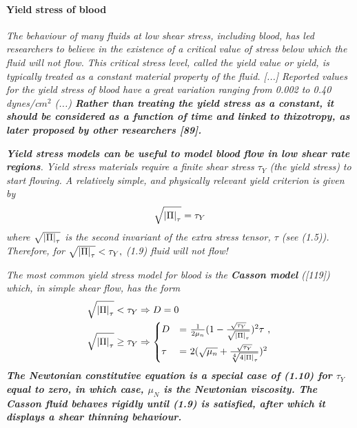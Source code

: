\documentclass[11pt,letterpaper]{article}
\begin{document}
\paragraph{Yield stress of blood} \textit{The behaviour of many fluids at low shear stress, including blood, has led researchers to believe in the existence of a critical value of stress below which the fluid will not flow. This critical stress level, called the yield value or yield, is typically treated as a constant material property of the fluid. [...] Reported values for the yield stress of blood have a great variation ranging from 0.002 to 0.40 dynes/c$m^2$ (...) \textbf{Rather than treating the yield stress as a constant, it should be considered as a function of time and linked to thixotropy, as later proposed by other researchers [89].}}

\textit{{\color{blue}\textbf{Yield stress models can be useful to model blood flow in low shear rate regions}}. Yield stress materials
require a finite shear stress $\tau_Y$ (the yield stress) to start flowing. A relatively simple, and physically relevant yield criterion is given by \begin{equation}
    \sqrt{\abs{\Pi}_{\tau}} = \tau_Y
\end{equation}
where $\sqrt{\abs{\Pi}_{\tau}}$ is the second invariant of the extra stress tensor, $\tau$  (see (1.5)). Therefore, for $ \sqrt{\abs{\Pi}_{\tau}} < \tau_Y,$ (1.9)
fluid will not flow!}


\textit{The most common yield stress model for blood is the {\color{red}\textbf{Casson model}} ([119]) which, in simple shear flow,
has the form\begin{align}
    \sqrt{\abs{\Pi}_{\tau}} < \tau_Y &\Rightarrow D=0 \\
    \sqrt{\abs{\Pi}_{\tau}} \geq \tau_Y &\Rightarrow  \begin{dcases*}
        D &= $\frac{1}{2\mu_n}(1- \frac{\sqrt{\tau_Y}}{ \sqrt{\abs{\Pi}_{\tau}}})^2\tau$ ,\\
        \tau &= $2(\sqrt{\mu_n}+\frac{\sqrt{\tau_Y}}{ \sqrt[4]{4\abs{\Pi}_{\tau}}})^2$
        \end{dcases*}
\end{align} \textbf{The Newtonian constitutive equation is a special case of (1.10) for $\tau_Y$ equal to zero, in which case, $\mu_N$ is the Newtonian viscosity. The Casson fluid behaves rigidly until (1.9) is satisfied, after which it displays a shear thinning behaviour.}} 
\end{document}
